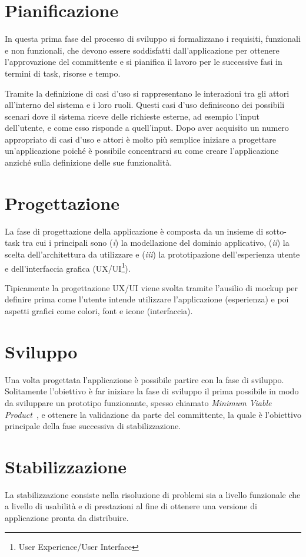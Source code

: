 \section{Pianificazione}
In questa prima fase del processo di sviluppo si formalizzano i requisiti, 
funzionali e non funzionali, 
che devono essere soddisfatti dall'applicazione per ottenere l'approvazione del committente e si pianifica il lavoro per le successive fasi in termini di task, risorse e tempo.

Tramite la definizione di casi d'uso si rappresentano le interazioni tra gli attori all'interno del sistema e i loro ruoli. 
Questi casi d'uso definiscono dei possibili scenari dove il sistema riceve delle richieste esterne, 
ad esempio l'input dell'utente,
e come esso risponde a quell'input. 
Dopo aver acquisito un numero appropriato di casi d'uso e attori è molto più semplice iniziare a progettare un'applicazione poiché è possibile concentrarsi su come creare l'applicazione anziché sulla definizione delle sue funzionalità.

\section{Progettazione}
La fase di progettazione della applicazione è composta da un insieme di sotto-task tra cui i principali sono (\textit{i}) la modellazione del dominio applicativo,
(\textit{ii}) la scelta dell'architettura da utilizzare e (\textit{iii}) la prototipazione dell'esperienza utente e dell'interfaccia grafica (UX/UI\footnote{User Experience/User Interface}).

Tipicamente la progettazione UX/UI viene svolta tramite l'ausilio di mockup per definire prima come l'utente intende utilizzare l'applicazione (esperienza) e poi aspetti grafici come colori,
font e icone (interfaccia).

\section{Sviluppo}
Una volta progettata l'applicazione è possibile partire con la fase di sviluppo. 
Solitamente l'obiettivo è far iniziare la fase di sviluppo il prima possibile in modo da sviluppare un prototipo funzionante, 
spesso chiamato \textit{Minimum Viable Product}~\cite{ries2011startup}, 
e ottenere la validazione da parte del committente, 
la quale è l'obiettivo principale della fase successiva di stabilizzazione.

\section{Stabilizzazione}
La stabilizzazione consiste nella risoluzione di problemi sia a livello funzionale che a livello di usabilità e di prestazioni al fine di ottenere una versione di applicazione pronta da distribuire. 

